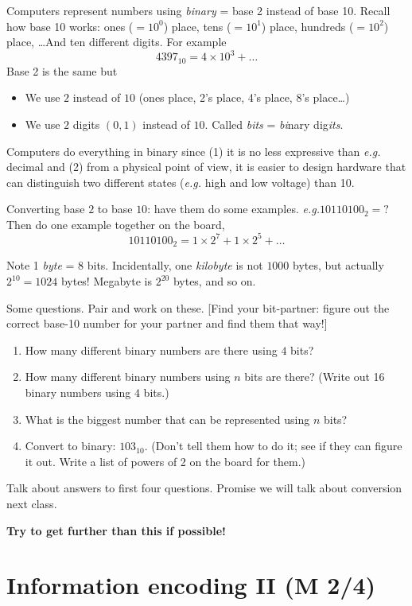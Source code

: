 \documentclass{article}
\newcommand{\eg}{\emph{e.g.}\xspace}
\newcommand{\ready}{\textcolor{Green}{\Checkmark}\xspace}
\begin{document}
Computers represent numbers using \emph{binary} = base 2 instead of
base 10.  Recall how base 10 works: ones ($=10^0$) place, tens
($=10^1$) place, hundreds ($=10^2$) place, \dots  And ten different
digits.  For example \[ 4397_{10} = 4 \times 10^3 + \dots \] Base 2 is
the same but
\begin{itemize}
\item We use $2$ instead of $10$ (ones place, 2's place, 4's place,
  8's place\dots)
\item We use $2$ digits $(0,1)$ instead of $10$.  Called \emph{bits} =
  \emph{bi}nary dig\emph{its}.
\end{itemize}
Computers do everything in binary since (1) it is no less expressive
than \eg decimal and (2) from a physical point of view, it is easier
to design hardware that can distinguish two different states
(\eg high and low voltage) than 10.

Converting base $2$ to base $10$: have them do some
examples. \eg $10110100_2 = ?$  Then do one example together on the
board, \[ 10110100_2 = 1 \times 2^7 + 1 \times 2^5 + \dots \]

Note 1 \emph{byte} = 8 bits.  Incidentally, one \emph{kilobyte} is not
$1000$ bytes, but actually $2^{10} = 1024$ bytes!  Megabyte is
$2^{20}$ bytes, and so on.

Some questions.  Pair and work on these. [Find your bit-partner:
figure out the correct base-10 number for your partner and find them
that way!]

\begin{enumerate}
\item How many different binary numbers are there using $4$ bits?
\item How many different binary numbers using $n$ bits are there?
  (Write out 16 binary numbers using $4$ bits.)
\item What is the biggest number that can be represented using $n$
  bits?
\item Convert to binary: $103_{10}$. (Don't tell them how to do it;
  see if they can figure it out.  Write a list of powers of 2 on the
  board for them.)
\end{enumerate}

Talk about answers to first four questions.  Promise we will talk
about conversion next class.

\textbf{Try to get further than this if possible!}

\newpage
\section{\ready Information encoding II (M 2/4)}
\end{document}

